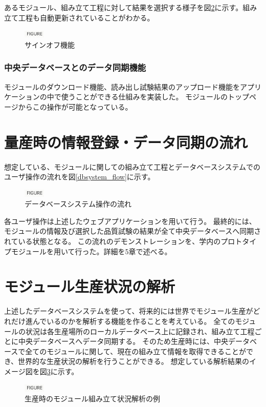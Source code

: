 あるモジュール、組み立て工程に対して結果を選択する様子を図\ref{webapp_sign_off}に示す。組み立て工程も自動更新されていることがわかる。

\begin{figure}[bpt]\centering
\includegraphics[width=1cm]{figure}
\caption[サインオフ機能]{サインオフ機能}
\label{webapp_sign_off}
\end{figure}

\subsubsection{中央データベースとのデータ同期機能}
モジュールのダウンロード機能、読み出し試験結果のアップロード機能をアプリケーションの中で使うことができる仕組みを実装した。
モジュールのトップページからこの操作が可能となっている。

\section{量産時の情報登録・データ同期の流れ}
想定している、モジュールに関しての組み立て工程とデータベースシステムでのユーザ操作の流れを図\ref{dbsystem_flow}に示す。

\begin{figure}[bpt]\centering
\includegraphics[width=1cm]{figure}
\caption[データベースシステム操作の流れ]{データベースシステム操作の流れ}
\label{webapp_sign_off}
\end{figure}

各ユーザ操作は上述したウェブアプリケーションを用いて行う。
最終的には、モジュールの情報及び選択した品質試験の結果が全て中央データベースへ同期されている状態となる。
この流れのデモンストレーションを、学内のプロトタイプモジュールを用いて行った。詳細を5章で述べる。

\section{モジュール生産状況の解析}
上述したデータベースシステムを使って、将来的には世界でモジュール生産がどれだけ進んでいるのかを解析する機能を作ることを考えている。
全てのモジュールの状況は各生産場所のローカルデータベース上に記録され、組み立て工程ごとに中央データベースへデータ同期する。
そのため生産時には、中央データベースで全てのモジュールに関して、現在の組み立て情報を取得できることができ、世界的な生産状況の解析を行うことができる。
想定している解析結果のイメージ図を図\ref{production_analysis}に示す。

\begin{figure}[bpt]\centering
\includegraphics[width=1cm]{figure}
\caption[生産時のモジュール組み立て状況解析の例]{生産時のモジュール組み立て状況解析の例}
\label{production_analysis}
\end{figure}

